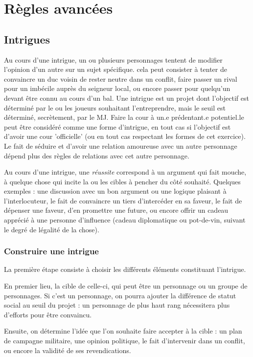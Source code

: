 \documentclass[10pt,a4paper]{book}
\begin{document}
\chapter{Règles avancées}
\begin{multicols}{2}
\section{Intrigues}
Au cours d'une intrigue, un ou plusieurs personnages tentent de modifier l'opinion d'un autre sur un sujet spécifique. cela peut consister à tenter de convaincre un duc voisin de rester neutre dans un conflit, faire passer un rival pour un imbécile auprès du seigneur local, ou encore passer pour quelqu'un devant être connu au cours d'un bal. Une intrigue est un projet dont l'objectif est déterminé par le ou les joueurs souhaitant l'entreprendre, mais le seuil est déterminé, secrètement, par le MJ. Faire la cour à un.e prédentant.e potentiel.le peut être considéré comme une forme d'intrigue, en tout cas si l'objectif est d'avoir une cour 'officielle' (ou en tout cas respectant les formes de cet exercice). Le fait de séduire et d'avoir une relation amoureuse avec un autre personnage dépend plus des règles de relations avec cet autre personnage.

Au cours d'une intrigue, une \emph{réussite} correspond à un argument qui fait mouche, à quelque chose qui incite la ou les cibles à pencher du côté souhaité. Quelques exemples : une discussion avec un bon argument ou une logique plaisant à l'interlocuteur, le fait de convaincre un tiers d'intercéder en sa faveur, le fait de dépenser une faveur, d'en promettre une future, ou encore offrir un cadeau apprécié à une personne d'influence (cadeau diplomatique ou pot-de-vin, suivant le degré de légalité de la chose).

\subsection{Construire une intrigue}
La première étape consiste à choisir les différents éléments constituant l'intrigue.

En premier lieu, la cible de celle-ci, qui peut être un personnage ou un groupe de personnages. Si c'est un personnage, on pourra ajouter la différence de statut social au seuil du projet : un personnage de plus haut rang nécessitera plus d'efforts pour être convaincu.

Ensuite, on détermine l'idée que l'on souhaite faire accepter à la cible : un plan de campagne militaire, une opinion politique, le fait d'intervenir dans un conflit, ou encore la validité de ses revendications.  


\end{multicols}
\end{document}
